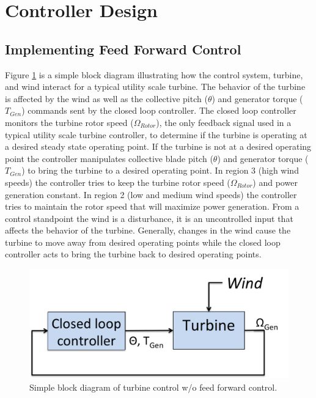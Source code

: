 \section{Controller Design} \label{section3-3}

\subsection{Implementing Feed Forward Control} \label{section3-3-1}

Figure \ref{fig3-7} is a simple block diagram illustrating how the control system, turbine, and wind interact for a typical utility scale turbine. The behavior of the turbine is affected by the wind as well as the collective pitch ($\theta$) and generator torque ($T_{Gen}$) commands sent by the closed loop controller. The closed loop controller monitors the turbine rotor speed ($\Omega_{Rotor}$), the only feedback signal used in a typical utility scale turbine controller, to determine if the turbine is operating at a desired steady state operating point. If the turbine is not at a desired operating point the controller manipulates collective blade pitch ($\theta$) and generator torque ($T_{Gen}$) to bring the turbine to a desired operating point. In region 3 (high wind speeds) the controller tries to keep the turbine rotor speed ($\Omega_{Rotor}$) and power generation constant. In region 2 (low and medium wind speeds) the controller tries to maintain the rotor speed that will maximize power generation. From a control standpoint the wind is a disturbance, it is an uncontrolled input that affects the behavior of the turbine. Generally, changes in the wind cause the turbine to move away from desired operating points while the closed loop controller acts to bring the turbine back to desired operating points.


 \begin{figure}[htb]
	\centering
		\includegraphics[width=.6\linewidth]{Figures/ch3Figures/fig3-7.png}
		
	\caption{Simple block diagram of turbine control w/o feed forward control.}
	\label{fig3-7}
\end{figure}

